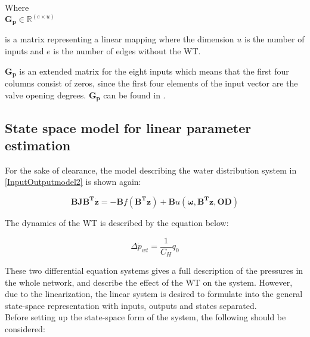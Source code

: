 \begin{minipage}[t]{0.24\textwidth}
Where\\
\hspace*{8mm} $\bm{G_p} \in \bm{\mathbb{R}}^{(e \times u)} $ 
\end{minipage}
\begin{minipage}[t]{0.74\textwidth}
\vspace*{2mm}
is a matrix representing a linear mapping where the dimension $u$ is the number of inputs and $e$ is the number of edges without the WT. 
\end{minipage} 

$\bm{G_p}$ is an extended matrix for the eight inputs which means that the first four columns consist of zeros, since the first four elements of the input vector are the valve opening degrees. $\bm{G_p}$ can be found in .


\subsection{State space model for linear parameter estimation}
 \label{SystemLin}

For the sake of clearance, the model describing the water distribution system in \eqref{InputOutputmodel2} is shown again:  

\begin{equation}
\bm{B} \bm{J} \bm{B^T} \bm{\dot{z}} = - \bm{B} f(\bm{B^T}\bm{z}) + \bm{B} u(\bm{\omega},\bm{B^T}\bm{z},\bm{OD}) 
 \label{InputOutputmodel3}
\end{equation}

The dynamics of the WT is described by the equation below: 

\begin{equation}
\Delta \dot{p}_{wt} = \frac{1}{C_H} q_0
 \label{WT_eq}
\end{equation}

These two differential equation systems gives a full description of the pressures in the whole network, and  describe the effect of the WT on the system. However, due to the linearization, the linear system is desired to formulate into the general state-space representation with inputs, outputs and states separated. 
\\
Before setting up the state-space form of the system, the following should be considered: 

